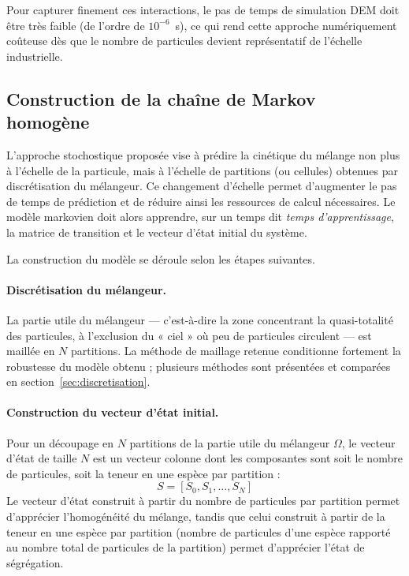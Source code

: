\documentclass{MemoireMaster}
\begin{document}
Pour capturer finement ces interactions, le pas de temps de simulation DEM doit être très faible (de l'ordre de $10^{-6}$~s), ce qui rend cette approche numériquement coûteuse dès que le nombre de particules devient représentatif de l'échelle industrielle.

\subsection{Construction de la chaîne de Markov homogène}
L'approche stochostique proposée vise à prédire la cinétique du mélange non plus à l'échelle de la particule, mais à l'échelle de partitions (ou cellules) obtenues par discrétisation du mélangeur. Ce changement d'échelle permet d'augmenter le pas de temps de prédiction et de réduire ainsi les ressources de calcul nécessaires. Le modèle markovien doit alors apprendre, sur un temps dit \emph{temps d'apprentissage}, la matrice de transition et le vecteur d'état initial du système.

La construction du modèle se déroule selon les étapes suivantes.

\paragraph{Discrétisation du mélangeur.} La partie utile du mélangeur --- c'est-à-dire la zone concentrant la quasi-totalité des particules, à l'exclusion du « ciel » où peu de particules circulent --- est maillée en $N$ partitions. La méthode de maillage retenue conditionne fortement la robustesse du modèle obtenu ; plusieurs méthodes sont présentées et comparées en section~\ref{sec:discretisation}.

\paragraph{Construction du vecteur d'état initial.} Pour un découpage en $N$ partitions de la partie utile du mélangeur $\Omega$, le vecteur d'état de taille $N$ est un vecteur colonne dont les composantes sont soit le nombre de particules, soit la teneur en une espèce par partition :
\begin{equation}
S = [S_0, S_1, \ldots, S_N]
\end{equation}
Le vecteur d'état construit à partir du nombre de particules par partition permet d'apprécier l'homogénéité du mélange, tandis que celui construit à partir de la teneur en une espèce par partition (nombre de particules d'une espèce rapporté au nombre total de particules de la partition) permet d'apprécier l'état de ségrégation.
\end{document}
